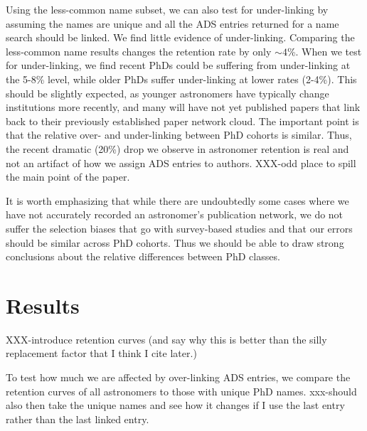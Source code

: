 \documentclass[preprint2]{aastex}
\begin{document}
Using the less-common name subset, we can also test for under-linking by assuming the names are unique and all the ADS entries returned for a name search should be linked.  We find little evidence of under-linking. Comparing the less-common name results changes the retention rate by only $\sim4$\%. When we test for under-linking, we find recent PhDs could be suffering from under-linking at the 5-8\% level, while older PhDs suffer under-linking at lower rates (2-4\%).  This should be slightly expected, as younger astronomers have typically change institutions more recently, and many will have not yet published papers that link back to their previously established paper network cloud.  The important point is that the relative over- and under-linking between PhD cohorts is similar.  Thus, the recent dramatic (20\%) drop we observe in astronomer retention is real and not an artifact of how we assign ADS entries to authors. XXX-odd place to spill the main point of the paper.



It is worth emphasizing that while there are undoubtedly some cases where we have not accurately recorded an astronomer's publication network, we do not suffer the selection biases that go with survey-based studies and that our errors should be similar across PhD cohorts.  Thus we should be able to draw strong conclusions about the relative differences between PhD classes.

\section{Results}

XXX-introduce retention curves (and say why this is better than the silly replacement factor that I think I cite later.)

To test how much we are affected by over-linking ADS entries, we compare the retention curves of all astronomers to those with unique PhD names.  xxx-should also then take the unique names and see how it changes if I use the last entry rather than the last linked entry.
\end{document}
